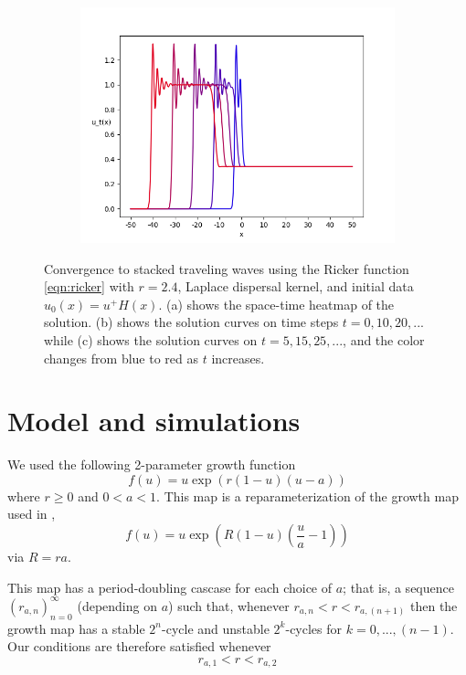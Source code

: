 \documentclass{article}
\theoremstyle{definition}
\numberwithin{equation}{section}
\begin{document}
\begin{figure}
\begin{subfigure}[b]{0.45\textwidth}
      \includegraphics[width=\textwidth]{figures/fig2c.png}
      \caption{}
  \end{subfigure}
  \caption{Convergence to stacked traveling waves using the Ricker function \eqref{eqn:ricker} with $r=2.4$, Laplace dispersal kernel, and initial data $u_0(x) = u^+H(x)$. (a) shows the space-time heatmap of the solution. (b) shows the solution curves on time steps $t=0,10,20,...$ while (c) shows the solution curves on $t=5,15,25,...$, and the color changes from blue to red as $t$ increases.}
  \label{fig:ricker_waves}
\end{figure}

\section{Model and simulations}

We used the following 2-parameter growth function
\begin{equation} \label{eqn:modified_ricker}
f(u) = u \exp \left( r (1 - u) ( u - a ) \right)
\end{equation}
where $r \geq 0$ and $0 < a < 1$.
This map is a reparameterization of the growth map used in \cite{otto2022},
\begin{equation} \label{eqn:modified_ricker}
f(u) = u \exp \left( R (1 - u) ( \frac{u}{a} - 1 ) \right)
\end{equation}
via $R = ra$.

This map has a period-doubling cascase for each choice of $a$; that is, a sequence $(r_{a,n})_{n=0}^{\infty}$ (depending on $a$) such that, whenever $r_{a,n} < r < r_{a,(n+1)}$ then the growth map has a stable $2^n$-cycle and unstable $2^k$-cycles for $k = 0, ..., (n-1)$. Our conditions are therefore satisfied whenever
\begin{equation}
  r_{a,1} < r < r_{a,2}
\end{equation}
\end{document}
